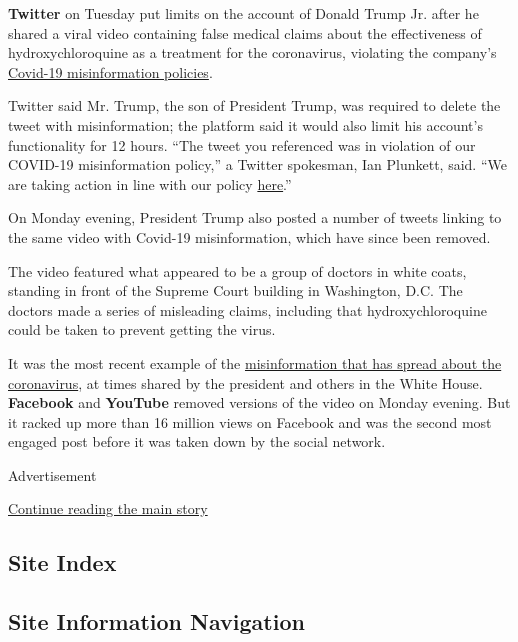 \textbf{Twitter} on Tuesday put limits on the account of Donald Trump
Jr. after he shared a viral video containing false medical claims about
the effectiveness of hydroxychloroquine as a treatment for the
coronavirus, violating the company's
\href{https://help.twitter.com/en/rules-and-policies/notices-on-twitter}{Covid-19
misinformation policies}.

Twitter said Mr. Trump, the son of President Trump, was required to
delete the tweet with misinformation; the platform said it would also
limit his account's functionality for 12 hours. ``The tweet you
referenced was in violation of our COVID-19 misinformation policy,'' a
Twitter spokesman, Ian Plunkett, said. ``We are taking action in line
with our policy
\href{https://help.twitter.com/en/rules-and-policies/notices-on-twitter}{here}.''

On Monday evening, President Trump also posted a number of tweets
linking to the same video with Covid-19 misinformation, which have since
been removed.

The video featured what appeared to be a group of doctors in white
coats, standing in front of the Supreme Court building in Washington,
D.C. The doctors made a series of misleading claims, including that
hydroxychloroquine could be taken to prevent getting the virus.

It was the most recent example of the
\href{https://www.nytimes3xbfgragh.onion/2020/05/20/technology/plandemic-movie-youtube-facebook-coronavirus.html}{misinformation
that has spread about the coronavirus}, at times shared by the president
and others in the White House. \textbf{Facebook} and \textbf{YouTube}
removed versions of the video on Monday evening. But it racked up more
than 16 million views on Facebook and was the second most engaged post
before it was taken down by the social network.

Advertisement

\protect\hyperlink{after-bottom}{Continue reading the main story}

\hypertarget{site-index}{%
\subsection{Site Index}\label{site-index}}

\hypertarget{site-information-navigation}{%
\subsection{Site Information
Navigation}\label{site-information-navigation}}

